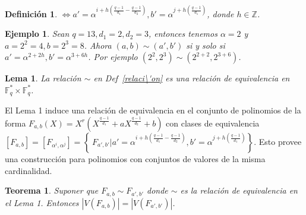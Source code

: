 \documentclass[landscape,final,paperwidth=24in,paperheight=36in]{baposter}
\newtheorem*{ejemplo*}{Ejemplo}
\newtheorem{definicion}{Definici\'on}
\newtheorem{lema}{Lema}
\newtheorem{teorema}{Teorema}
\begin{document}
\begin{poster}
{\begin{definicion}
  $\Longleftrightarrow a' = \alpha^{i+h(\frac{q-1}{d_1} - \frac{q-1}{d_2})}, b' = \alpha^{j+h(\frac{q-1}{d_1})}$, donde $h \in \mathbb{Z}$.

\end{definicion}

  \begin{ejemplo*}
    Sean $q = 13, d_1 = 2, d_2 = 3$, entonces tenemos $\alpha = 2$ y $a = 2^2 = 4, b = 2^3 = 8$. Ahora $(a,b) \sim (a',b')$ si y solo si
    $a' = \alpha^{2+2h}, b' = \alpha^{3+6h}$. Por ejemplo $(2^2,2^3) \sim (2^{2+2},2^{3+6})$.
  \end{ejemplo*}

\begin{lema}
  
  La relaci\'on $\sim$ en Def~\ref{relaci\'on} es una relaci\'on de equivalencia en $\mathbb{F}_q^* \times \mathbb{F}_q^*$.

\end{lema}

\vspace{0.2cm}

  El Lema 1 induce una relaci\'on de equivalencia en el conjunto de polinomios de la forma $F_{a,b}(X) = X^r(X^{\frac{q-1}{d_1}} + aX^{\frac{q-1}{d_2}} +b)$ con clases de equivalencia $[F_{a,b}] = [F_{\alpha^i, \alpha^j}] = \left\{\ F_{a',b'} | a' = \alpha^{i+h(\frac{q-1}{d_1} - \frac{q-1}{d_2})}, b' = \alpha^{j+h(\frac{q-1}{d_1})} \right\}$.
  \vspace{0.2cm}
  Esto provee una construcci\'{o}n para polinomios con conjuntos de valores de la misma cardinalidad.

  \vspace{0.2cm}

\begin{teorema}
  
  Suponer que $F_{a,b} \sim F_{a',b'}$ donde $\sim$ es la relaci\'on de equivalencia en el Lema 1. Entonces $|V(F_{a,b})| = |V(F_{a',b'})|$.

\end{teorema}

\vspace{0.2cm}
   

 }\label{valuesets}


\end{poster}
\end{document}
